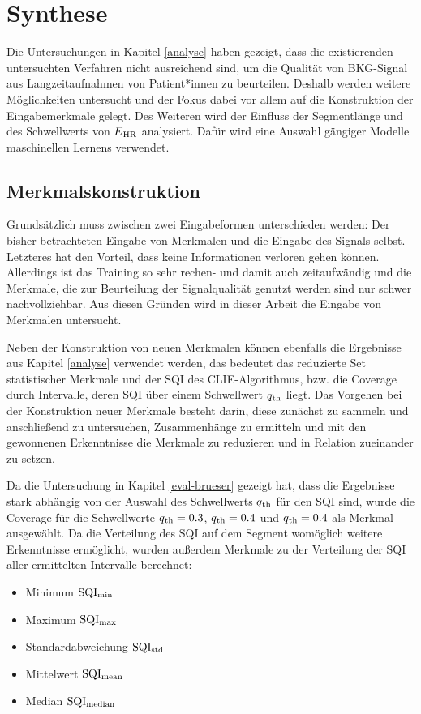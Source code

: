 \chapter{Synthese}

Die Untersuchungen in Kapitel \ref{analyse} haben gezeigt, dass die existierenden untersuchten Verfahren nicht ausreichend sind, um die Qualität von \ac{BKG}-Signal aus Langzeitaufnahmen von Patient*innen zu beurteilen. Deshalb werden weitere Möglichkeiten untersucht und der Fokus dabei vor allem auf die Konstruktion der Eingabemerkmale gelegt. Des Weiteren wird der Einfluss der Segmentlänge und des Schwellwerts von $E\textsubscript{HR}$ analysiert. Dafür wird eine Auswahl gängiger Modelle maschinellen Lernens verwendet.

\section{Merkmalskonstruktion}

Grundsätzlich muss zwischen zwei Eingabeformen unterschieden werden: Der bisher betrachteten Eingabe von Merkmalen und die Eingabe des Signals selbst. Letzteres hat den Vorteil, dass keine Informationen verloren gehen können. Allerdings ist das Training so sehr rechen- und damit auch zeitaufwändig und die Merkmale, die zur Beurteilung der Signalqualität genutzt werden sind nur schwer nachvollziehbar. Aus diesen Gründen wird in dieser Arbeit die Eingabe von Merkmalen untersucht.

Neben der Konstruktion von neuen Merkmalen können ebenfalls die Ergebnisse aus Kapitel \ref{analyse} verwendet werden, das bedeutet das reduzierte Set statistischer Merkmale und der \ac{SQI} des \ac{CLIE}-Algorithmus, bzw. die Coverage durch Intervalle, deren \ac{SQI} über einem Schwellwert $q\textsubscript{th}$ liegt. Das Vorgehen bei der Konstruktion neuer Merkmale besteht darin, diese zunächst zu sammeln und anschließend zu untersuchen, Zusammenhänge zu ermitteln und mit den gewonnenen Erkenntnisse die Merkmale zu reduzieren und in Relation zueinander zu setzen.

Da die Untersuchung in Kapitel \ref{eval-brueser} gezeigt hat, dass die Ergebnisse stark abhängig von der Auswahl des Schwellwerts $q\textsubscript{th}$ für den \ac{SQI} sind, wurde die Coverage für die Schwellwerte $q\textsubscript{th} = 0.3$, $q\textsubscript{th} = 0.4$ und $q\textsubscript{th} = 0.4$ als Merkmal ausgewählt. Da die Verteilung des \ac{SQI} auf dem Segment womöglich weitere Erkenntnisse ermöglicht, wurden außerdem Merkmale zu der Verteilung der \ac{SQI} aller ermittelten Intervalle berechnet:
\begin{itemize}
	\item Minimum $\text{SQI}\textsubscript{min}$
	\item Maximum $\text{SQI}\textsubscript{max}$
	\item Standardabweichung $\text{SQI}\textsubscript{std}$
	\item Mittelwert $\text{SQI}\textsubscript{mean}$
	\item Median $\text{SQI}\textsubscript{median}$
\end{itemize}

